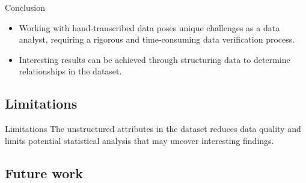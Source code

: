 \documentclass[]{beamer}
\begin{document}
\begin{frame}{Conclusion}


	
	\begin{itemize}
		\item Working with hand-transcribed data poses unique challenges as a data analyst, requiring a rigorous and time-consuming data verification process.
		\item Interesting results can be achieved through structuring data to determine relationships in the dataset.
	\end{itemize}


\end{frame}






\subsection{Limitations}

\begin{frame}{Limitations}
	The unstructured attributes in the dataset reduces data quality and limits potential statistical analysis that may uncover interesting findings.

\end{frame}

	\subsection{Future work}
\end{document}

